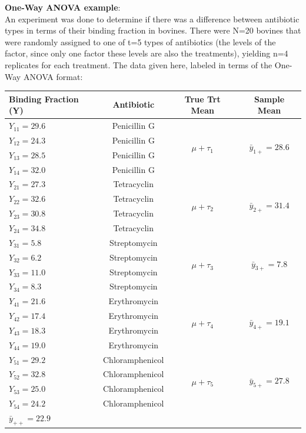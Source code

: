 \textbf{One-Way ANOVA example}:\\
An experiment was done to determine if there was a difference between antibiotic types in terms of their binding fraction in bovines.  There were N=20 bovines that were randomly assigned to one of t=5 types of antibiotics (the levels of the factor, since only one factor these levels are also the treatments), yielding n=4 replicates for each treatment.  The data given here, labeled in terms of the One-Way ANOVA format:
\begin{center}
\begin{tabular}{lc|cc} 
Binding Fraction (Y) & Antibiotic& True Trt Mean & Sample Mean\\\hline
$Y_{11}=29.6$ & Penicillin G &\multirow{4}{*}{$\mu+\tau_1$}&\multirow{4}{*}{$\bar{y}_{1+}=28.6$}\\
$Y_{12}=24.3$ & Penicillin G \\
$Y_{13}=28.5$ & Penicillin G \\
$Y_{14}=32.0$ & Penicillin G \\\hline
$Y_{21}=27.3$ & Tetracyclin&\multirow{4}{*}{$\mu+\tau_2$}&\multirow{4}{*}{$\bar{y}_{2+}=31.4$}\\
$Y_{22}=32.6$ & Tetracyclin\\
$Y_{23}=30.8$ & Tetracyclin\\
$Y_{24}=34.8$ & Tetracyclin\\\hline
$Y_{31}=5.8$ & Streptomycin&\multirow{4}{*}{$\mu+\tau_3$}&\multirow{4}{*}{$\bar{y}_{3+}=7.8$}\\
$Y_{32}=6.2$ & Streptomycin\\
$Y_{33}=11.0$ & Streptomycin\\
$Y_{34}=8.3$ & Streptomycin\\\hline
$Y_{41}=21.6$ & Erythromycin&\multirow{4}{*}{$\mu+\tau_4$}&\multirow{4}{*}{$\bar{y}_{4+}=19.1$}\\
$Y_{42}=17.4$ & Erythromycin\\
$Y_{43}=18.3$ & Erythromycin\\
$Y_{44}=19.0$ & Erythromycin\\\hline
$Y_{51}=29.2$ & Chloramphenicol&\multirow{4}{*}{$\mu+\tau_5$}&\multirow{4}{*}{$\bar{y}_{5+}=27.8$}\\
$Y_{52}=32.8$ & Chloramphenicol\\
$Y_{53}=25.0$ & Chloramphenicol\\
$Y_{54}=24.2$ & Chloramphenicol\\\hline
\multicolumn{4}{l}{$\bar{y}_{++}=22.9$}\\
\end{tabular}
\end{center}


